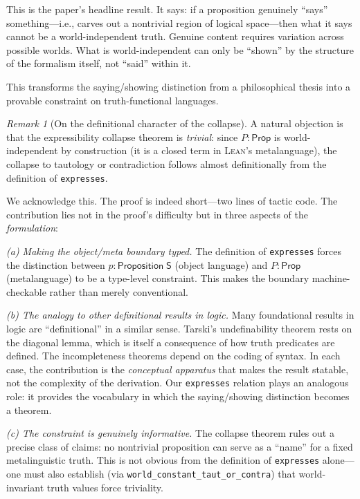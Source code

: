 \documentclass[10pt, letterpaper]{article}
\theoremstyle{definition}
\theoremstyle{remark}
\newtheorem{remark}[theorem]{Remark}
\newcommand{\Sach}{\mathsf{S}}
\newcommand{\Prop}{\mathsf{Prop}}
\newcommand{\Lean}{\textsc{Lean}}
\begin{document}
\noindent
This is the paper's headline result.  It says: if a proposition
genuinely ``says'' something---i.e., carves out a nontrivial
region of logical space---then what it says cannot be a
world-independent truth.  Genuine content requires variation
across possible worlds.  What is world-independent can only be
``shown'' by the structure of the formalism itself, not ``said''
within it.

This transforms the saying/showing distinction from a
philosophical thesis into a provable constraint on
truth-functional languages.

\begin{remark}[On the definitional character of the collapse]
\label{rem:triviality}
A natural objection is that the expressibility collapse theorem
is \emph{trivial}: since $P : \Prop$ is world-independent by
construction (it is a closed term in \Lean's metalanguage), the
collapse to tautology or contradiction follows almost
definitionally from the definition of \texttt{expresses}.

We acknowledge this.  The proof is indeed short---two lines of
tactic code.  The contribution lies not in the proof's
difficulty but in three aspects of the \emph{formulation}:

\emph{(a) Making the object/meta boundary typed.}  The
definition of \texttt{expresses} forces the distinction between
$p : \mathsf{Proposition}\;\Sach$ (object language) and
$P : \Prop$ (metalanguage) to be a type-level constraint.  This
makes the boundary machine-checkable rather than merely
conventional.

\emph{(b) The analogy to other definitional results in logic.}
Many foundational results in logic are ``definitional'' in
a similar sense.  Tarski's undefinability theorem rests on the
diagonal lemma, which is itself a consequence of how truth
predicates are defined.  The incompleteness theorems depend on
the coding of syntax.  In each case, the contribution is the
\emph{conceptual apparatus} that makes the result statable, not
the complexity of the derivation.  Our \texttt{expresses}
relation plays an analogous role: it provides the vocabulary in
which the saying/showing distinction becomes a theorem.

\emph{(c) The constraint is genuinely informative.}
The collapse theorem rules out a precise class of claims:
no nontrivial proposition can serve as a ``name'' for a fixed
metalinguistic truth.  This is not obvious from the definition
of \texttt{expresses} alone---one must also establish
(via \texttt{world\_constant\_taut\_or\_contra}) that
world-invariant truth values force triviality.
\end{remark}
\end{document}
